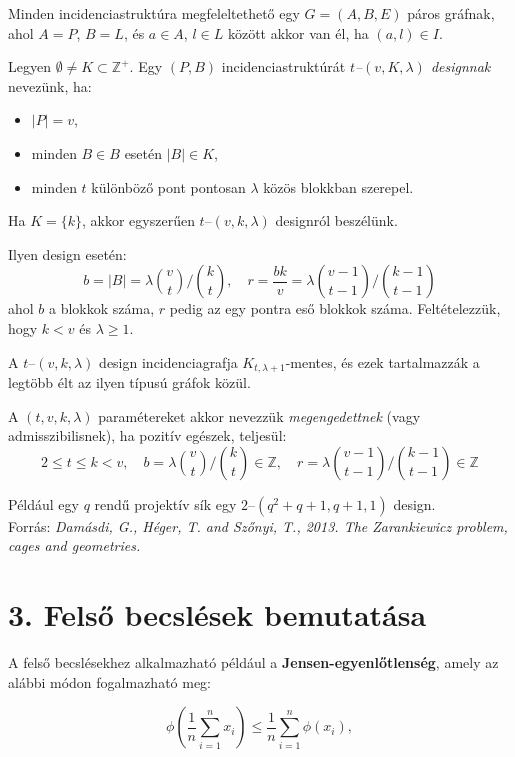 \documentclass[12pt,a4paper]{article}
\begin{document}
Minden incidenciastruktúra megfeleltethető egy $G = (A, B, E)$ páros gráfnak, ahol $A = P$, $B = L$, és $a \in A$, $l \in L$ között akkor van él, ha $(a, l) \in I$.

Legyen $\emptyset \neq K \subset \mathbb{Z}^+$. Egy $(P, B)$ incidenciastruktúrát \emph{$t$--$(v, K, \lambda)$ designnak} nevezünk, ha:
\begin{itemize}[nosep]
  \item $|P| = v$,
  \item minden $B \in B$ esetén $|B| \in K$,
  \item minden $t$ különböző pont pontosan $\lambda$ közös blokkban szerepel.
\end{itemize}
Ha $K = \{k\}$, akkor egyszerűen $t$--$(v, k, \lambda)$ designról beszélünk.

Ilyen design esetén:
\[
b = |B| = \lambda \binom{v}{t} \bigg/ \binom{k}{t}, \quad
r = \frac{bk}{v} = \lambda \binom{v-1}{t-1} \bigg/ \binom{k-1}{t-1}
\]
ahol $b$ a blokkok száma, $r$ pedig az egy pontra eső blokkok száma. Feltételezzük, hogy $k < v$ és $\lambda \geq 1$.

A $t$--$(v, k, \lambda)$ design incidenciagrafja $K_{t, \lambda+1}$-mentes, és ezek tartalmazzák a legtöbb élt az ilyen típusú gráfok közül.

A $(t, v, k, \lambda)$ paramétereket akkor nevezzük \emph{megengedettnek} (vagy admisszibilisnek), ha pozitív egészek, teljesül:
\[
2 \leq t \leq k < v, \quad
b = \lambda \binom{v}{t} \bigg/ \binom{k}{t} \in \mathbb{Z}, \quad
r = \lambda \binom{v-1}{t-1} \bigg/ \binom{k-1}{t-1} \in \mathbb{Z}
\]

Például egy $q$ rendű projektív sík egy $2$--$(q^2 + q + 1, q + 1, 1)$ design.
\\[5mm]
\noindent Forrás: \textit{Damásdi, G., Héger, T. and Szőnyi, T., 2013. The Zarankiewicz problem, cages and geometries.}


\section*{3. Felső becslések bemutatása}
A felső becslésekhez alkalmazható például a \textbf{Jensen-egyenlőtlenség}, amely az alábbi módon fogalmazható meg:

\[
\phi\left( \frac{1}{n} \sum_{i=1}^{n} x_i \right) \leq \frac{1}{n} \sum_{i=1}^{n} \phi(x_i),
\]
\end{document}
